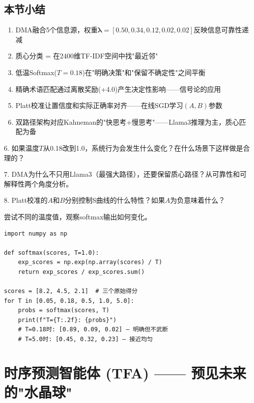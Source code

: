 \documentclass[11pt,a4paper]{ctexart}
\begin{document}
\subsection{本节小结}

\begin{enumerate}[nosep]
\item DMA融合5个信息源，权重$\boldsymbol{\lambda} = [0.50, 0.34, 0.12, 0.02, 0.02]$反映信息可靠性递减
\item 质心分类 = 在2400维TF-IDF空间中找"最近邻"
\item 低温Softmax($T=0.18$)在"明确决策"和"保留不确定性"之间平衡
\item 精确术语匹配通过离散奖励(+4.0)产生决定性影响——信号论的应用
\item Platt校准让置信度和实际正确率对齐——在线SGD学习$(A, B)$参数
\item 双路径架构对应Kahneman的"快思考+慢思考"——Llama3推理为主，质心匹配为备
\end{enumerate}

\begin{exerbox}[思考题 6--8]
6. 如果温度$T$从0.18改到1.0，系统行为会发生什么变化？在什么场景下这样做是合理的？

7. DMA为什么不只用Llama3（最强大路径），还要保留质心路径？从可靠性和可解释性两个角度分析。

8. Platt校准的$A$和$B$分别控制S曲线的什么特性？如果$A$为负意味着什么？
\end{exerbox}

\begin{codebox}
尝试不同的温度值，观察softmax输出如何变化。
\small
\begin{verbatim}
import numpy as np

def softmax(scores, T=1.0):
    exp_scores = np.exp(np.array(scores) / T)
    return exp_scores / exp_scores.sum()

scores = [8.2, 4.5, 2.1]  # 三个原始得分
for T in [0.05, 0.18, 0.5, 1.0, 5.0]:
    probs = softmax(scores, T)
    print(f"T={T:.2f}: {probs}")
    # T=0.18时: [0.89, 0.09, 0.02] — 明确但不武断
    # T=5.0时: [0.45, 0.32, 0.23] — 接近均匀
\end{verbatim}
\normalsize
\end{codebox}

\newpage

\section{时序预测智能体 (TFA) —— 预见未来的"水晶球"}
\end{document}
